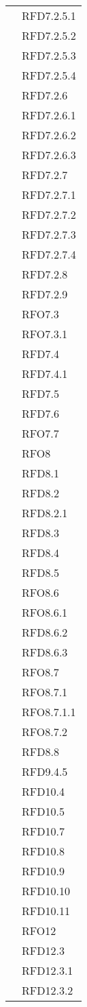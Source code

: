 \begin{longtable}{|>{\centering}m{10cm}|m{3cm}<{\centering}|}
& RFD7.2.5.1\\
& RFD7.2.5.2\\
& RFD7.2.5.3\\
& RFD7.2.5.4\\
& RFD7.2.6\\
& RFD7.2.6.1\\
& RFD7.2.6.2\\
& RFD7.2.6.3\\
& RFD7.2.7\\
& RFD7.2.7.1\\
& RFD7.2.7.2\\
& RFD7.2.7.3\\
& RFD7.2.7.4\\
& RFD7.2.8\\
& RFD7.2.9\\
& RFO7.3\\
& RFO7.3.1\\
& RFD7.4\\
& RFD7.4.1\\
& RFD7.5\\
& RFD7.6\\
& RFO7.7\\
& RFO8\\
& RFD8.1\\
& RFD8.2\\
& RFD8.2.1\\
& RFD8.3\\
& RFD8.4\\
& RFD8.5\\
& RFO8.6\\
& RFO8.6.1\\
& RFD8.6.2\\
& RFD8.6.3\\
& RFO8.7\\
& RFO8.7.1\\
& RFO8.7.1.1\\
& RFO8.7.2\\
& RFD8.8\\
& RFD9.4.5\\
& RFD10.4\\
& RFD10.5\\
& RFD10.7\\
& RFD10.8\\
& RFD10.9\\
& RFD10.10\\
& RFD10.11\\
& RFO12\\
& RFD12.3\\
& RFD12.3.1\\
& RFD12.3.2\\

\end{longtable}
